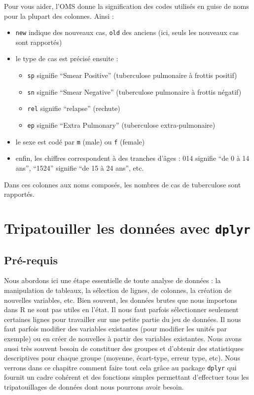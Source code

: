 \documentclass[a4paperpaper,]{article}
\providecommand{\tightlist}{%
  \setlength{\itemsep}{0pt}\setlength{\parskip}{0pt}}
\theoremstyle{definition}
\theoremstyle{definition}
\theoremstyle{definition}
\theoremstyle{remark}
\begin{document}
Pour vous aider, l'OMS donne la signification des codes utilisés en
guise de noms pour la plupart des colonnes. Ainsi :

\begin{itemize}
\tightlist
\item
  \texttt{new} indique des nouveaux cas, \texttt{old} des anciens (ici,
  seuls les nouveaux cas sont rapportés)
\item
  le type de cas est précisé ensuite :

  \begin{itemize}
  \tightlist
  \item
    \texttt{sp} signifie ``Smear Positive'' (tuberculose pulmonaire à
    frottis positif)
  \item
    \texttt{sn} signifie ``Smear Negative'' (tuberculose pulmonaire à
    frottis négatif)
  \item
    \texttt{rel} signifie ``relapse'' (rechute)
  \item
    \texttt{ep} signifie ``Extra Pulmonary'' (tuberculose
    extra-pulmonaire)
  \end{itemize}
\item
  le sexe est codé par \texttt{m} (male) ou \texttt{f} (female)
\item
  enfin, les chiffres correspondent à des tranches d'âges : 014 signifie
  ``de 0 à 14 ans'', ``1524'' signifie ``de 15 à 24 ans'', etc.
\end{itemize}

Dans ces colonnes aux noms composés, les nombres de cas de tuberculose
sont rapportés.

\hypertarget{wrangling}{%
\section{\texorpdfstring{Tripatouiller les données avec
\texttt{dplyr}}{Tripatouiller les données avec dplyr}}\label{wrangling}}

\hypertarget{pre-requis}{%
\subsection{Pré-requis}\label{pre-requis}}

Nous abordons ici une étape essentielle de toute analyse de données : la
manipulation de tableaux, la sélection de lignes, de colonnes, la
création de nouvelles variables, etc. Bien souvent, les données brutes
que nous importons dans R ne sont pas utiles en l'état. Il nous faut
parfois sélectionner seulement certaines lignes pour travailler sur une
petite partie du jeu de données. Il nous faut parfois modifier des
variables existantes (pour modifier les unités par exemple) ou en créer
de nouvelles à partir des variables existantes. Nous avons aussi très
souvent besoin de constituer des groupes et d'obtenir des statistiques
descriptives pour chaque groupe (moyenne, écart-type, erreur type, etc).
Nous verrons dans ce chapitre comment faire tout cela grâce au package
\texttt{dplyr} qui fournit un cadre cohérent et des fonctions simples
permettant d'effectuer tous les tripatouillages de données dont nous
pourrons avoir besoin.
\end{document}
